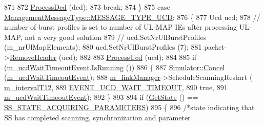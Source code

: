 \begin{DoxyCode}
871 
872                 \hyperlink{classns3_1_1SubscriberStationNetDevice_a9ea614322ab68e822ccde4c19c7a16e1}{ProcessDcd} (dcd);
873                 \textcolor{keywordflow}{break};
874               \}
875             \textcolor{keywordflow}{case} \hyperlink{classns3_1_1ManagementMessageType_a0e0c7a1e263538f0379d1bdb015abe3daa447105448b9b6e1e8c4773b9ab56119}{ManagementMessageType::MESSAGE\_TYPE\_UCD}:
876               \{
877                 Ucd ucd;
878                 \textcolor{comment}{// number of burst profiles is set to number of UL-MAP IEs after processing UL-MAP, not a
       very good solution}
879                 \textcolor{comment}{// ucd.SetNrUlBurstProfiles (m\_nrUlMapElements);}
880                 ucd.SetNrUlBurstProfiles (7);
881                 packet->\hyperlink{classns3_1_1Packet_a0961eccf975d75f902d40956c93ba63e}{RemoveHeader} (ucd);
882 
883                 \hyperlink{classns3_1_1SubscriberStationNetDevice_a6bfed3721385a96f7e2e03bcf08eedac}{ProcessUcd} (ucd);
884 
885                 \textcolor{keywordflow}{if} (\hyperlink{classns3_1_1SubscriberStationNetDevice_a851bc1fe752fe52544c8efdc7ac0e20a}{m\_ucdWaitTimeoutEvent}.\hyperlink{classns3_1_1EventId_aabf8476d1a080c199ea0c6aa9ccea372}{IsRunning} ())
886                   \{
887                     \hyperlink{classns3_1_1Simulator_a1b903a62d6117ef28f7ba3c6500689bf}{Simulator::Cancel} (\hyperlink{classns3_1_1SubscriberStationNetDevice_a851bc1fe752fe52544c8efdc7ac0e20a}{m\_ucdWaitTimeoutEvent});
888                     \hyperlink{classns3_1_1SubscriberStationNetDevice_a24e7df59fb312c196318f0366b63c6e6}{m\_linkManager}->ScheduleScanningRestart (
      \hyperlink{classns3_1_1SubscriberStationNetDevice_abd4606ca817aac181dc06966881c3571}{m\_intervalT12},
889                                                             
      \hyperlink{classns3_1_1SubscriberStationNetDevice_ad6dff9205fc72eef67ad77bbe6730fbba54aabc99dee573919fdadedec1805a0c}{EVENT\_UCD\_WAIT\_TIMEOUT},
890                                                             \textcolor{keyword}{true},
891                                                             
      \hyperlink{classns3_1_1SubscriberStationNetDevice_a851bc1fe752fe52544c8efdc7ac0e20a}{m\_ucdWaitTimeoutEvent});
892                   \}
893 
894                 \textcolor{keywordflow}{if} (\hyperlink{classns3_1_1WimaxNetDevice_a4b7a2a630af23ac97b1012d5e5facc9f}{GetState} () == \hyperlink{classns3_1_1SubscriberStationNetDevice_af9f145bc05df1f18610a3d4b61ff9ee4afbd36119d59678d1f5e448ff7b681cd8}{SS\_STATE\_ACQUIRING\_PARAMETERS})
895                   \{
896                     \textcolor{comment}{/*state indicating that SS has completed scanning, synchronization and parameter
}
\end{DoxyCode}
